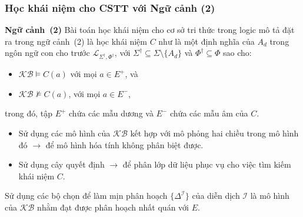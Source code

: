 \documentclass[notheorems,xcolor=dvipsnames]{beamer}
\newcommand{\mL}		{\mathcal{L}}
\newcommand{\mI}		{\mathcal{I}}
\newcommand{\SigmaDag}	{\Sigma^\dag}
\newcommand{\PhiDag}	{\Phi^\dag}
\newcommand{\KB}		{\mathcal{KB}}
\newcommand{\mLSPD}		{\mL_{\Sigma^\dag,\Phi^\dag}}
\begin{document}
\begin{frame}\frametitle{\bf Học khái niệm cho CSTT với Ngữ cảnh (2)}
	\vspace{-1.5ex}
	\begin{block}{\bf Ngữ cảnh~(2)}
		Bài toán học khái niệm cho cơ sở tri thức trong logic mô tả đặt ra trong ngữ cảnh~(2) là học khái niệm $C$ như là một định nghĩa của $A_d$ trong ngôn ngữ con cho trước $\mLSPD$, với $\SigmaDag \subseteq \Sigma \setminus \{A_d\}$ và $\PhiDag \subseteq \Phi$ sao cho:
		
		\begin{itemize}
			\setlength{\itemsep}{1.0ex}
			\item $\KB \models C(a)$ với mọi $a \in E^+$, và
			\item $\KB \not\models C(a)$, với mọi $a \in E^-$,
		\end{itemize}
		trong đó, tập $E^+$ chứa các mẫu dương và $E^-$ chứa các mẫu âm của $C$.
	\end{block}
	\vspace{-1.0ex}		
	\begin{itemize}
		\setlength{\itemsep}{1.0ex}
		\item Sử dụng các mô hình của $\KB$ kết hợp với mô phỏng hai chiều trong mô hình đó $\rightarrow$ để mô hình hóa tính không phân biệt được.
		
		\item Sử dụng cây quyết định $\rightarrow$ để phân lớp dữ liệu phục vụ cho việc tìm kiếm khái niệm $C$. 
	\end{itemize}
	\vspace{-0.5ex}
	Sử dụng các bộ chọn để làm mịn phân hoạch $\{\Delta^\mI\}$ của diễn dịch $\mI$ là mô hình của $\KB$ nhằm đạt được phân hoạch nhất quán với $E$.
	
\end{frame}
\end{document}
